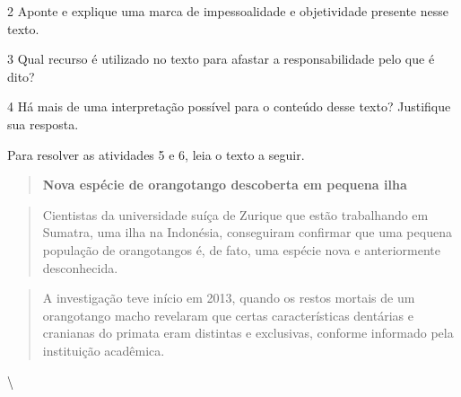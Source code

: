 
\num{2} Aponte e explique uma marca de impessoalidade e objetividade
presente nesse texto.


\num{3} Qual recurso é utilizado no texto para afastar a
responsabilidade pelo que é dito?


\num{4} Há mais de uma interpretação possível para o conteúdo desse
texto? Justifique sua resposta.


Para resolver as atividades 5 e 6, leia o texto a seguir.

\begin{quote}
\textbf{Nova espécie de orangotango descoberta em pequena ilha}
\end{quote}

\begin{quote}
Cientistas da universidade suíça de Zurique que estão trabalhando em
Sumatra, uma ilha na Indonésia, conseguiram confirmar que uma pequena
população de orangotangos é, de fato, uma espécie nova e anteriormente
desconhecida.
\end{quote}

\begin{quote}
A investigação teve início em 2013, quando os restos mortais de um
orangotango macho revelaram que certas características dentárias e
cranianas do primata eram distintas e exclusivas, conforme informado
pela instituição acadêmica.
\end{quote}

\textbackslash {}

